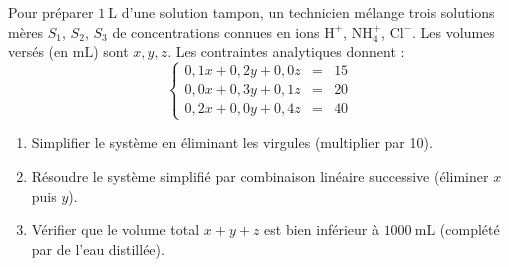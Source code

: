 \documentclass[11pt]{article}
\begin{document}
\begin{exercice}
Pour préparer $1~\text{L}$ d'une solution tampon, un technicien mélange trois solutions mères $S_1$, $S_2$, $S_3$ de concentrations connues en ions $\mathrm{H}^+$, $\mathrm{NH}_4^+$, $\mathrm{Cl}^-$. Les volumes versés (en $\text{mL}$) sont $x, y, z$. Les contraintes analytiques donnent :
\[
\left\{
\begin{array}{rcl}
0{,}1x + 0{,}2y + 0{,}0z &=& 15 \\
0{,}0x + 0{,}3y + 0{,}1z &=& 20 \\
0{,}2x + 0{,}0y + 0{,}4z &=& 40
\end{array}
\right.
\]
\begin{enumerate}
    \item Simplifier le système en éliminant les virgules (multiplier par 10).
    \item Résoudre le système simplifié par combinaison linéaire successive (éliminer $x$ puis $y$).
    \item Vérifier que le volume total $x+y+z$ est bien inférieur à $1000~\text{mL}$ (complété par de l'eau distillée).
\end{enumerate}
\end{exercice}
\end{document}

